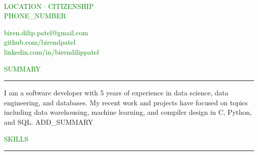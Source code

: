 \documentclass [
        11pt
] {article}
\begin{document}
\begin{multicols}{2}

\\
\noindent \textcolor{green}{LOCATION $ \boldsymbol{\cdot} $ CITIZENSHIP}\\
	\noindent \textcolor{green}{PHONE_NUMBER}\\

\columnbreak

\hspace*{\fill} \noindent \textcolor{green}{biren.dilip.patel@gmail.com}\\
\hspace*{\fill} \noindent \textcolor{green}{github.com/birendpatel}\\
\hspace*{\fill} \noindent \textcolor{green}{linkedin.com/in/birendilippatel}

\end{multicols}


\noindent\textcolor{green}{SUMMARY \rule{16.35cm}{1pt}}

\vspace*{10pt}

\noindent I am a software developer with 5 years of experience in data science, 
data engineering, and databases. My recent work and projects have focused on
topics including data warehousing, machine learning, and compiler design in
C, Python, and SQL. ADD_SUMMARY 

\vspace*{10pt}



\noindent\textcolor{green}{SKILLS \rule{17cm}{1pt}}
\end{document}
